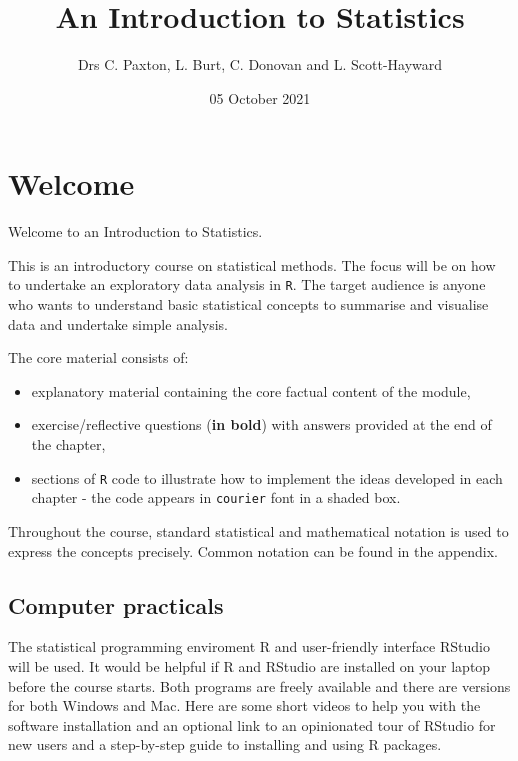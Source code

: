 \documentclass[
  oneside]{krantz}
\title{An Introduction to Statistics}
\author{Drs C. Paxton, L. Burt, C. Donovan and L. Scott-Hayward}
\date{05 October 2021}
\providecommand{\tightlist}{%
  \setlength{\itemsep}{0pt}\setlength{\parskip}{0pt}}
\begin{document}
\maketitle

{
\hypersetup{linkcolor=}
\setcounter{tocdepth}{2}
\tableofcontents
}
\hypertarget{welcome}{%
\chapter*{Welcome}\label{welcome}}


Welcome to an Introduction to Statistics.

This is an introductory course on statistical methods. The focus will be on how to undertake an exploratory data analysis in \texttt{R}. The target audience is anyone who wants to understand basic statistical concepts to summarise and visualise data and undertake simple analysis.

The core material consists of:

\begin{itemize}
\tightlist
\item
  explanatory material containing the core factual content of the module,
\item
  exercise/reflective questions (\textbf{in bold}) with answers provided at the end of the chapter,
\item
  sections of \texttt{R} code to illustrate how to implement the ideas developed in each chapter - the code appears in \texttt{courier} font in a shaded box.
\end{itemize}

Throughout the course, standard statistical and mathematical notation is used to express the concepts precisely. Common notation can be found in the appendix.

\hypertarget{computer-practicals}{%
\section*{Computer practicals}\label{computer-practicals}}


The statistical programming enviroment R and user-friendly interface RStudio will be used. It would be helpful if R and RStudio are installed on your laptop before the course starts. Both programs are freely available and there are versions for both Windows and Mac. Here are some short videos to help you with the software installation and an optional link to an opinionated tour of RStudio for new users and a step-by-step guide to installing and using R packages.
\end{document}
